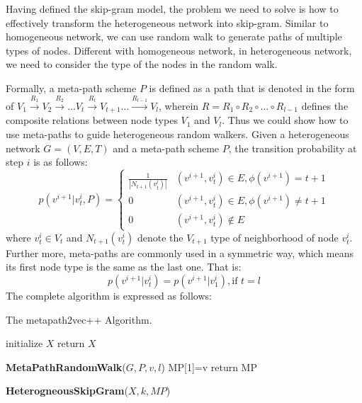 \documentclass[conference]{IEEEtran}
\begin{document}
Having defined the skip-gram model, the problem we need to solve is how to effectively transform the heterogeneous network into skip-gram. Similar to homogeneous network, we can use random walk to generate paths of multiple types of nodes. Different with homogeneous network, in heterogeneous network, we need to consider the type of the nodes in the random walk.

Formally, a meta-path scheme $P$ is defined as a path that is denoted in the form of $V_1 \xrightarrow{R_1}V_2\xrightarrow{R_2}\dots V_t\xrightarrow{R_t}V_{t+1}\dots\xrightarrow{R_{l-1}}V_l$, wherein $R=R_1 \circ R_2 \circ \dots \circ R_{l-1}$ defines the composite relations between node types $V_1$ and $V_l$. Thus we could show how to use meta-paths to guide heterogeneous random walkers. Given a heterogeneous network $G=(V,E,T)$ and a meta-path scheme $P$, the transition probability at step $i$ is as follows:
\begin{equation}
	p(v^{i+1}|v_t^i,P)=\begin{cases}
		\frac{1}{|N_{t+1}(v_t^l)|}&(v^{i+1},v_t^i)\in E,\phi(v^{i+1})=t+1\\0&(v^{i+1},v_t^i)\in E,\phi(v^{i+1})\neq t+1\\0&(v^{i+1},v_t^i)\notin E
	\end{cases}
\label{equ:tran}
\end{equation}
where $v_t^i\in V_t$ and $N_{t+1}(v_t^i)$ denote the $V_{t+1}$ type of neighborhood of node $v_t^i$. Further more, meta-paths are commonly used in a symmetric way, which means its first node type is the same as the last one. That is:
\begin{equation}
	p(v^{i+1}|v_t^i)=p(v^{i+1}|v_1^i),\text{if } t=l
\end{equation}
The complete algorithm is expressed as follows:
\begin{algorithm}[h]
  \caption{The metapath2vec++ Algorithm.}  
  initialize $X$\;  
  {
  }
  return $X$\;
  
  \textbf{MetaPathRandomWalk}($G,P,v,l$)
  MP[1]=v\;
  return MP\;
  
  \textbf{HeterogneousSkipGram}($X,k,MP$)
\end{algorithm}  
\end{document}
